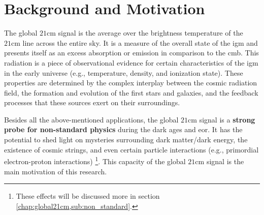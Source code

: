 \documentclass[12pt, TexShade, letterpaper]{report}
\begin{document}
\section{Background and Motivation}
The global $\mathrm{21cm}$ signal is the average over the brightness temperature of the $\mathrm{21cm}$ line across the entire sky. It is a measure of the overall state of the \gls{igm} and presents itself as an excess absorption or emission in comparison to the \gls{cmb}. This radiation is a piece of observational evidence for certain characteristics of the \gls{igm} in the early universe (e.g., temperature, density, and ionization state). These properties are determined by the complex interplay between the cosmic radiation field, the formation and evolution of the first stars and galaxies, and the feedback processes that these sources exert on their surroundings\cite{21century}.\par
Besides all the above-mentioned applications, the global $\mathrm{21cm}$ signal is a \textbf{strong probe for non-standard physics} during the dark ages and \gls{eor}. It has the potential to shed light on mysteries surrounding dark matter/dark energy, the existence of cosmic strings, and even certain particle interactions (e.g., primordial electron-proton interactions) \cite{dark_nature_21, constrain_dm_21, cosmic_string_brandenberger, ee_interaction_21, neutrino_21} \footnote{These effects will be discussed more in section \ref{chap:global21cm,sub:non_standard}.}. This capacity of the global $\mathrm{21cm}$ signal is the main motivation of this research.\par
\end{document}
